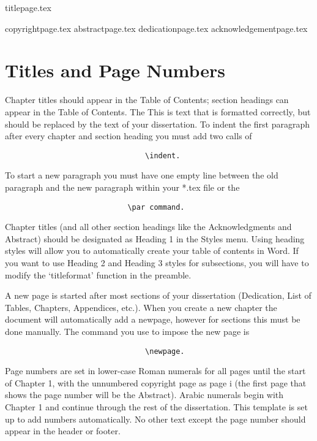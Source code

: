 \documentclass[12pt, draft]{report}
\begin{document}
{titlepage.tex} %

{copyrightpage.tex}
{abstractpage.tex}
\setcounter{page}{2}
{dedicationpage.tex}
{acknowledgementpage.tex}
\tableofcontents
\newpage
\listoffigures
{}
\newpage
\listoftables
{}
\newpage
\listofappendices
\newpage
\chapter{Titles and Page Numbers}
Chapter titles should appear in the Table of Contents; section headings can appear in the Table of Contents. The 
This is text that is formatted correctly, but should be replaced by the text of your dissertation. To indent the first paragraph after every chapter and section heading you must add two calls of
\begin{verbatim}
                                \indent.
\end{verbatim}
To start a new paragraph you must have one empty line between the old paragraph and the new paragraph within your *.tex file or the 
\begin{verbatim}
                            \par command.
\end{verbatim}
\par
Chapter titles (and all other section headings like the Acknowledgments and Abstract) should be designated as Heading 1 in the Styles menu. 
Using heading styles will allow you to automatically create your table of contents in Word. If you want to use Heading 2 and Heading 3 styles for subsections, you will have to modify the `titleformat' function in the preamble.

A new page is started after most sections of your dissertation (Dedication, List of Tables, Chapters, Appendices, etc.). When you create a new chapter the document will automatically add a newpage, however for sections this must be done manually. The command you use to impose the new page is
\begin{verbatim}
                                \newpage.
\end{verbatim}  
Page numbers are set in lower-case Roman numerals for all pages until the start of Chapter 1, with the unnumbered copyright page as page i (the first page that shows the page number will be the Abstract). Arabic numerals begin with Chapter 1 and continue through the rest of the dissertation. This template is set up to add numbers automatically. No other text except the page number should appear in the header or footer.
\newpage
\end{document}
